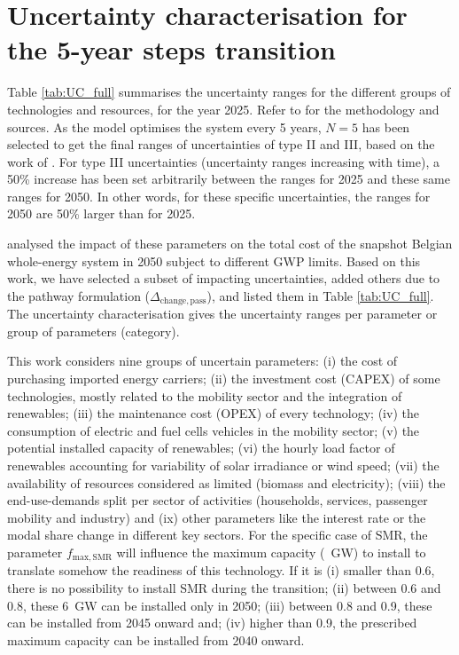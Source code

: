 \section{Uncertainty characterisation for the 5-year steps transition} 
\label{app:UC_full}
Table \ref{tab:UC_full} summarises the uncertainty ranges for the different groups of technologies and resources, for the year 2025. Refer to \cite{Moret2017, Moret2017PhDThesis} for the methodology and sources. As the model optimises the system every 5 years, $N=5$ has been selected to get the final ranges of uncertainties of type II and III, based on the work of \citet{Moret2017PhDThesis}. For type III uncertainties (\ie uncertainty ranges increasing with time), a 50\% increase has been set arbitrarily between the ranges for 2025 and these same ranges for 2050. In other words, for these specific uncertainties, the ranges for 2050 are 50\% larger than for 2025.

\citet{rixhon2021role} analysed the impact of these parameters on the total cost of the snapshot Belgian whole-energy system in 2050 subject to different \gls{GWP} limits. Based on this work, we have selected a subset of impacting uncertainties, added others due to the pathway formulation (\eg $\Delta_{\mathrm{change,pass}}$), and listed them in Table \ref{tab:UC_full}. The uncertainty characterisation gives the uncertainty ranges per parameter or group of parameters (category).

This work considers nine groups of uncertain parameters: (i) the cost of purchasing imported energy carriers; (ii) the investment cost (\ie CAPEX) of some technologies, mostly related to the mobility sector and the integration of renewables; (iii) the maintenance cost (\ie OPEX) of every technology; (iv) the consumption of electric and fuel cells vehicles in the mobility sector; (v) the potential installed capacity of renewables; (vi) the hourly load factor of renewables accounting for variability of solar irradiance or wind speed; (vii) the availability of resources considered as limited (\ie biomass and electricity); (viii) the end-use-demands split per sector of activities (\ie households, services, passenger mobility and industry) and (ix) other parameters like the interest rate or the modal share change in different key sectors. For the specific case of \gls{SMR}, the parameter $f_{\mathrm{max,SMR}}$ will influence the maximum capacity (~GW) to install to translate somehow the readiness of this technology. If it is (i) smaller than 0.6, there is no possibility to install \gls{SMR} during the transition; (ii) between 0.6 and 0.8, these 6~GW can be installed only in 2050; (iii) between 0.8 and 0.9, these can be installed from 2045 onward and; (iv) higher than 0.9, the prescribed maximum capacity can be installed from 2040 onward. 


